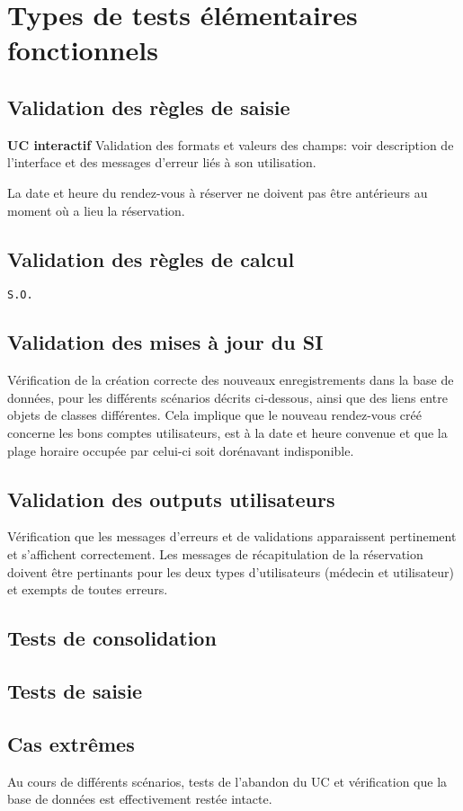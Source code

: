 \documentclass[a4paper, 11pt]{report}
\begin{document}
	\section{Types de tests élémentaires fonctionnels}
	\subsection{Validation des règles de saisie}
	\textbf{UC interactif}
	Validation des formats et valeurs des champs: voir description de l’interface et
	des messages d’erreur liés à son utilisation.

	La date et heure du rendez-vous à réserver ne doivent pas être antérieurs au
	moment où a lieu la réservation. 
	\subsection{Validation des règles de calcul}
	\texttt{S.O.}
	\subsection{Validation des mises à jour du SI}
	Vérification de la création correcte des nouveaux enregistrements dans la base
	de données, pour les différents scénarios décrits ci-dessous, ainsi que des
	liens entre objets de classes différentes. 
	Cela implique que le nouveau rendez-vous créé concerne les bons comptes
	utilisateurs, est à la date et heure convenue et que la plage horaire occupée
	par celui-ci soit dorénavant indisponible.
	\subsection{Validation des outputs utilisateurs}
	Vérification que les messages d’erreurs et de validations apparaissent
	pertinement et s’affichent correctement. Les messages de récapitulation de la
	réservation doivent être pertinants pour les deux types d’utilisateurs (médecin
	et utilisateur) et exempts de toutes erreurs.
	\subsection{Tests de consolidation}

	\subsection{Tests de saisie}
	\subsection{Cas extrêmes}
	Au cours de différents scénarios, tests de l’abandon du UC et vérification que
	la base de données est effectivement restée intacte.
\end{document}
